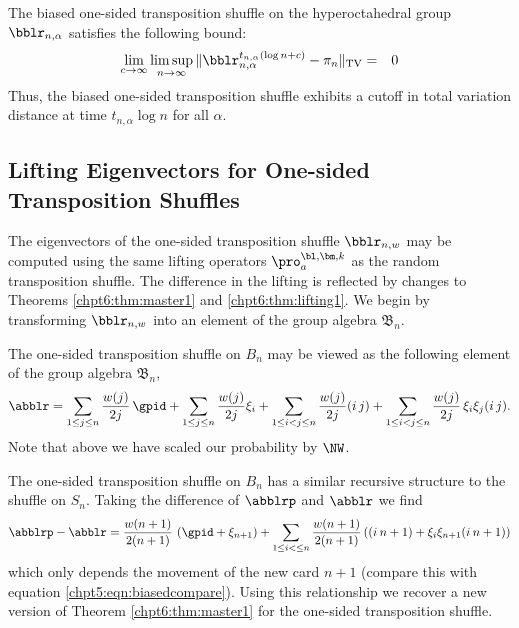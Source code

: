 \documentclass[11pt]{report}
\begin{document}
\begin{conj}
	\label{chpt6:conj:ostupper}
	The biased one-sided transposition shuffle on the hyperoctahedral group  $\bblr_{n,\alpha}$ satisfies the following bound:
	\begin{eqnarray*}
		\lim_{c\to \infty} \limsup_{n\rightarrow \infty}\, \lVert 
		\bblr_{n,\alpha}^{t_{n,\alpha}\left(\log n + c \right)} -\pi_{n} 
		\rVert_{\tiny \textnormal{TV}} & 
		= & 0 
	\end{eqnarray*}
	Thus, the biased one-sided transposition shuffle  exhibits a cutoff in total variation distance at time $t_{n,\alpha}\log n$ for all $\alpha$.
\end{conj}













\subsection{Lifting Eigenvectors for One-sided Transposition Shuffles}
\label{chpt6:subsec:ostlifting}

The eigenvectors of the one-sided transposition shuffle $\bblr_{n,w}$ may be computed using the same lifting operators $\pro_{a}^{\bl,\bm,k}$ as the random transposition shuffle. The difference in the lifting is reflected by changes to Theorems \ref{chpt6:thm:master1} and \ref{chpt6:thm:lifting1}. We begin by transforming $\bblr_{n,w}$ into an element of the group algebra $\mathfrak{B}_{n}$.

\begin{defn}
	The one-sided transposition shuffle on $B_{n}$ may be viewed as the following element of the group algebra
	$\mathfrak{B}_{n}$,
	\begin{eqnarray}
	\abblr = \sum_{1 \leq j \leq n} \frac{w(j)}{2j} \, \gpid + \sum_{1\leq j \leq n} \frac{w(j)}{2j} \xi_{i} +  
	\sum_{1\leq i < j \leq n} \frac{w(j)}{2j} (i \, j)  +  \sum_{1\leq i <j\leq n} \frac{w(j)}{2j} \, \xi_{i}\xi_{j}(i \, j ). \label{chpt6:eqn:blr}
	\end{eqnarray}
	Note that above we have scaled our probability by $\NW$.
\end{defn}
The one-sided transposition shuffle on $B_{n}$ has a similar recursive structure to the shuffle on $S_{n}$. Taking the difference of $\abblrp$ and $\abblr$ we find 
\[\abblrp - \abblr = \frac{w(n+1)}{2(n+1)} \, \left(\gpid + \xi_{n+1} \right)+  
\sum_{1\leq i < \leq n} \frac{w(n+1)}{2(n+1)} \left( (i \hspace{0.2em} n+1)  +  \xi_{i}\xi_{n+1}(i \hspace{0.2em} n+1) \right)\]
which only depends the movement of the new card $n+1$ (compare this with equation \eqref{chpt5:eqn:biasedcompare}).
Using this relationship we recover a new version of Theorem \ref{chpt6:thm:master1} for the one-sided transposition shuffle.
\end{document}
